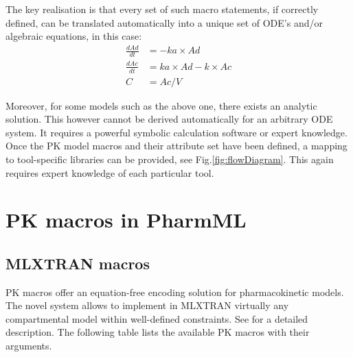 The key \marginpar{\HandCuffLeft} realisation is that every set of such macro statements, 
if correctly defined, can be translated automatically into a unique set of ODE's and/or 
algebraic equations, in this case:
\begin{align}
\frac{dAd}{dt} &= -ka \times Ad \nonumber \\
\frac{dAc}{dt} &= ka \times Ad - k \times Ac  \nonumber \\
C &= Ac/V \nonumber
\end{align}

Moreover, for some models such as the above one, there exists an analytic solution. This however cannot 
be derived automatically for an arbitrary ODE system. It requires a powerful symbolic calculation 
software or expert knowledge. Once the PK model macros and their attribute set have been defined, 
a mapping to tool-specific libraries can be provided, see Fig.\ref{fig:flowDiagram}. 
This again requires expert knowledge of each particular tool. 



\section{PK macros in PharmML}
\label{subsec:PKmacros}

\subsection{MLXTRAN macros}
\label{sec:MLXTRANmacros}

PK macros offer an equation-free encoding solution for pharmacokinetic models. 
The novel system allows to implement in MLXTRAN virtually any compartmental 
model within well-defined constraints. See \cite{MLXTRANforMonolix:2014} for a detailed 
description. The following table lists the available PK macros with their arguments. 

